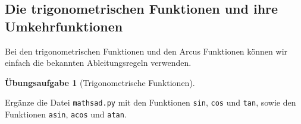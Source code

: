 \documentclass[
  a4paper,
  DIV=11]{scrreprt}
\theoremstyle{definition}
\newtheorem{exercise}{Übungsaufgabe}[chapter]
\theoremstyle{definition}
\theoremstyle{remark}
\begin{document}
\hypertarget{die-trigonometrischen-funktionen-und-ihre-umkehrfunktionen}{%
\subsection{Die trigonometrischen Funktionen und ihre
Umkehrfunktionen}\label{die-trigonometrischen-funktionen-und-ihre-umkehrfunktionen}}

Bei den trigonometrischen Funktionen und den Arcus Funktionen können wir
einfach die bekannten Ableitungsregeln verwenden.

\begin{exercise}[Trigonometrische
Funktionen]\protect\hypertarget{exr-implementTrig}{}\label{exr-implementTrig}

Ergänze die Datei \texttt{mathsad.py} mit den Funktionen \texttt{sin},
\texttt{cos} und \texttt{tan}, sowie den Funktionen \texttt{asin},
\texttt{acos} und \texttt{atan}.

\end{exercise}
\end{document}
